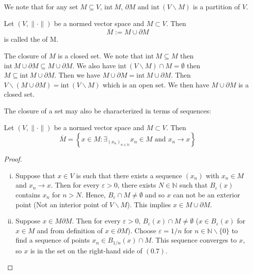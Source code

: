 \documentclass[10pt]{article}
\let\emph\relax %
\newcommand{\N}{\mathbb{N}}
\begin{document}
  \begin{remark}
    We note that for any set $M \subseteq V$, $\text{int}~M$, $\partial M$ and $\text{int}~(V \backslash M)$ is a partition of $V$.
  \end{remark}

  \begin{definition}
    Let $(V,\|\cdot\|)$ be a normed vector space and $M \subset V$.
    Then
    \[\overline{M}:=M \cup \partial M\]
    is called the \emph{closure} of M.
  \end{definition}
      
  \begin{remark}
    The closure of $M$ is a closed set. We note that $\text{int}~M \subseteq M$ 
    then $\text{int}~M \cup \partial M \subseteq M \cup \partial M$. 
    We also have $\text{int}~(V \backslash M) \cap M = \emptyset$ then $M \subseteq \text{int}~M \cup \partial M$.
    Then we have $M \cup \partial M = \text{int}~M \cup \partial M$.
    Then $V \backslash (M \cup \partial M) = \text{int}~(V \backslash M)$ which is an open set.
    We then have $M \cup \partial M$ is a closed set.
  \end{remark}

  The closure of a set may also be characterized in terms of sequences:
  \begin{lemma}
    Let $(V, \|\cdot\|)$ be a normed vector space and $M \subset V$. Then
    \begin{equation}
      \overline{M} = \left\{
        x \in M: \mathop{\exists}_{(x_{n})_{n \in \N}} x_{n} \in M \text{ and }x_{n} \rightarrow x
      \right\}
    \end{equation}
  \end{lemma}
  
  \begin{proof}
    \begin{enumerate}[(i)]
      \item Suppose that $x \in V$ is such that there exists a sequence $(x_{n})$ with $x_{n} \in M$ and $x_{n} \rightarrow x$.
      Then for every $\varepsilon > 0$, there exists $N \in \N$ such that $B_{\varepsilon}(x)$ contains $x_{n}$ for $n > N$.
      Hence, $B_{\varepsilon} \cap M \neq \emptyset$ and so $x$ can not be an exterior point (Not an interior point of $V \backslash M$).
      This implies $x \in M \cup \partial M$.
      
      \item Suppose $x \in M \partial M$. Then for every $\varepsilon > 0$, $B_{\varepsilon}(x) \cap M \neq \emptyset$ 
      ($x \in B_{\varepsilon}(x)$ for $x \in M$ and from definition of $x \in \partial M$).
      Choose $\varepsilon = 1/n$ for $n \in \N \backslash \{0\}$ to find a sequence of points $x_{n} \in B_{1/n}(x) \cap M$.
      This sequence converges to $x$, so $x$ is in the set on the right-hand side of $(0.7)$.
    \end{enumerate}
  \end{proof}
\end{document}
